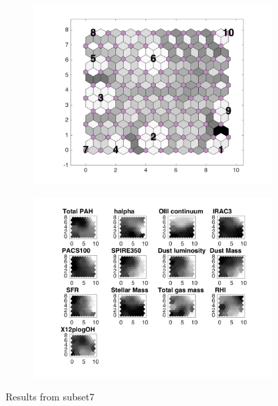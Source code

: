 \begin{figure}
    \begin{subfigure}[b]{0.5\textwidth}
        \centering
        \includegraphics[width=\textwidth]{../../images0.01/M31/2D/image_subsets/subset7_dist_with_hits_t.png}
        \label{fig: subset7_dist}
    \end{subfigure}
    \hfill
    \begin{subfigure}[b]{0.5\textwidth}
        \includegraphics[width=\textwidth]{../../images0.01/M31/2D/image_subsets/weight_planes_subset7.png}
        \label{fig: subset7_plane}
    \end{subfigure}
    \caption{Results from subset7}
    \label{fig: subset7}
\end{figure}
